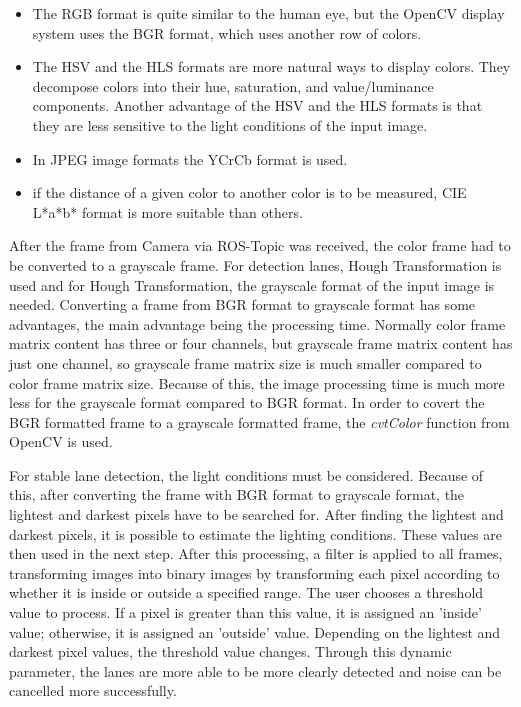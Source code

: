 \begin{itemize}

\item The RGB format is quite similar to the human eye, but the OpenCV display system uses the BGR format, which uses another row of colors.  

\item The HSV and the HLS formats are more natural ways to display colors. They decompose colors into their hue, saturation, and value/luminance components. Another advantage of the HSV and the HLS formats is that they are less sensitive to the light conditions of the input image.

\item In JPEG image formats the YCrCb format is used.

\item if the distance of a given color to another color is to be measured, CIE L*a*b* format is more suitable than others.

\end{itemize}

After the frame from Camera via ROS-Topic was received, the color frame had to be converted to a grayscale frame. For detection lanes, Hough Transformation is used and for Hough Transformation, the grayscale format of the input image is needed. Converting a frame from BGR format to grayscale format has some advantages, the main advantage being the processing time. Normally color frame matrix content has three or four channels, but grayscale frame matrix content has just one channel, so grayscale frame matrix size is much smaller compared to color frame matrix size. Because of this, the image processing time is much more less for the grayscale format compared to BGR format. In order to covert the BGR formatted frame to a grayscale formatted frame, the \textit{cvtColor} function from OpenCV is used.

For stable lane detection, the light conditions must be considered. Because of this, after converting the frame with BGR format to grayscale format, the lightest and darkest pixels have to be searched for. After finding the lightest and darkest pixels, it is possible to estimate the lighting conditions. These values are then used in the next step. After this processing, a filter is applied to all frames, transforming images into binary images by transforming each pixel according to whether it is inside or outside a specified range. The user chooses a threshold value to process. If a pixel is greater than this value, it is assigned an 'inside' value; otherwise, it is assigned an 'outside' value. Depending on the lightest and darkest pixel values, the threshold value changes. Through this dynamic parameter, the lanes are more able to be more clearly detected and noise can be cancelled more successfully.

